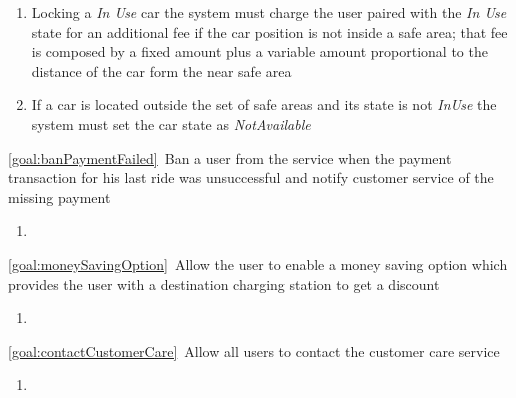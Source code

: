 \begin{description}
\begin{enumerate}[resume*]
  				\item Locking a \emph{In Use} car the system must charge the user paired with the
  				\emph{In Use} state for an additional fee if the car position is not inside a safe area; that
  				fee is composed by a fixed amount plus a variable amount proportional to the distance of
  				the car form the near safe area
  				\item If a car is located outside the set of safe areas and its state is not \emph{InUse} the
  				system must set the car state as \emph{NotAvailable}
   			\end{enumerate}
   		\item \ref{goal:banPaymentFailed}\ Ban a user from the service when the payment transaction
  		for his last ride was unsuccessful and notify customer service of the missing
  		payment
  			\begin{enumerate}[resume*]
  				\item
  			\end{enumerate}
  		\item \ref{goal:moneySavingOption}\ Allow the user to enable a money saving option which
  		provides the user with a destination charging station to get a discount
  			\begin{enumerate}[resume*]
  				\item
   			\end{enumerate}
  		\item \ref{goal:contactCustomerCare}\ Allow all users to contact the customer care service
  			\begin{enumerate}[resume*]
  				\item
   			\end{enumerate}
  	\end{description}

